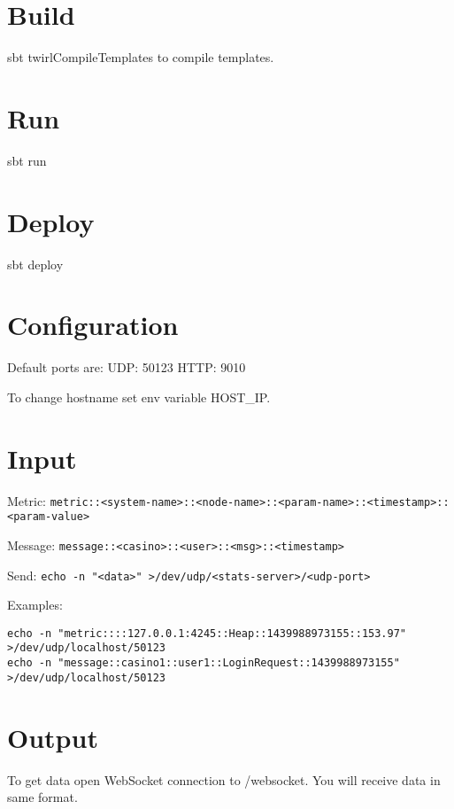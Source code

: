 \section*{Build}

sbt twirlCompileTemplates to compile templates.

\section*{Run}

sbt run

\section*{Deploy}

sbt deploy

\section*{Configuration}

Default ports are:
UDP: 50123
HTTP: 9010

To change hostname set env variable HOST_IP.

\section*{Input}

Metric:
\verb|metric::<system-name>::<node-name>::<param-name>::<timestamp>::<param-value>|

Message: 
\verb|message::<casino>::<user>::<msg>::<timestamp>|

Send: 
\verb|echo -n "<data>" >/dev/udp/<stats-server>/<udp-port>|

Examples:
\begin{lstlisting}
echo -n "metric::::127.0.0.1:4245::Heap::1439988973155::153.97" >/dev/udp/localhost/50123
echo -n "message::casino1::user1::LoginRequest::1439988973155" >/dev/udp/localhost/50123
\end{lstlisting}

\section*{Output}
To get data open WebSocket connection to /websocket. You will receive data in same format.
